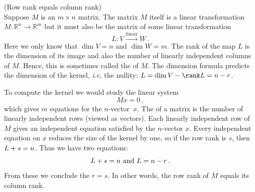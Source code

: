 \begin{example} (Row rank equals column rank)\\
Suppose $M$ is an $m\times n$ matrix. The matrix  $M$ itself is a linear transformation $M:{\mathbb R}^n \rightarrow {\mathbb R}^m$ but it  must also  be the matrix of some linear transformation
\[
L:V\stackrel{\textrm{linear}}\longrightarrow W\, .
\]
Here we only know that $\dim V =n$ and $\dim W =m$. The rank of the map $L$ is the dimension of its image and also the number of linearly independent columns of $M$. Hence, this is sometimes called the  of $M$. The dimension formula predicts  the dimension of the kernel, {\itshape i.e.} the nullity:  $ \null L= \dim V-\rank L=n-r$. 

To compute the kernel we would study the linear system \[Mx=0\, ,\] which gives $m$ equations for the $n$-vector~$x$. The  of a matrix is the number of linearly independent rows (viewed as vectors).
Each linearly independent row of $M$ gives an independent equation satisfied by the $n$-vector $x$. Every independent equation on $x$ reduces the size of the kernel by one, so if the row rank is $s$, then $\null L+ s = n$.  Thus we have two equations: 
\[
\null L+s=n \text{ and } \null L = n-r\, .
\]
From these we conclude the $r=s$. In other words, the row rank of $M$ equals its column rank.
 \end{example}



